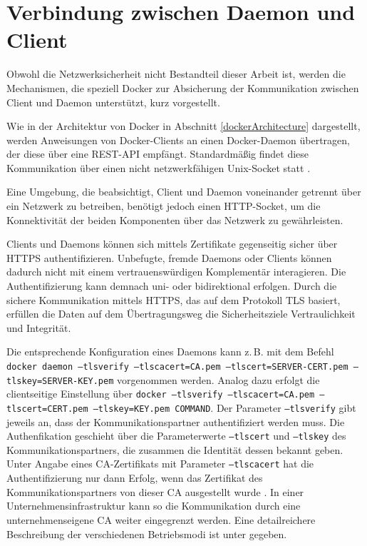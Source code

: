 \documentclass[../main.tex]{subfiles}
\begin{document}


  \section{Verbindung zwischen Daemon und Client}
  \label{conClientServer}
    Obwohl die Netzwerksicherheit nicht Bestandteil dieser Arbeit ist, werden die Mechanismen, die speziell Docker zur Absicherung der Kommunikation zwischen Client und Daemon unterstützt, kurz vorgestellt.

    Wie in der Architektur von Docker in Abschnitt \ref{dockerArchitecture} dargestellt, werden Anweisungen von Docker-Clients an einen Docker-Daemon übertragen, der diese über eine \acrshort{REST}-\acrshort{API} empfängt. Standardmäßig findet diese Kommunikation über einen nicht netzwerkfähigen Unix-Socket statt \cite{dockerSecurity}.

    Eine Umgebung, die beabsichtigt, Client und Daemon voneinander getrennt über ein Netzwerk zu betreiben, benötigt jedoch einen HTTP-Socket, um die Konnektivität der beiden Komponenten über das Netzwerk zu gewährleisten.

    Clients und Daemons können sich mittels Zertifikate gegenseitig sicher über HTTPS authentifizieren. Unbefugte, fremde Daemons oder Clients können dadurch nicht mit einem vertrauenswürdigen Komplementär interagieren. Die Authentifizierung kann demnach uni- oder bidirektional erfolgen. Durch die sichere Kommunikation mittels HTTPS, das auf dem Protokoll \acrshort{TLS} basiert, erfüllen die Daten auf dem Übertragungsweg die Sicherheitsziele Vertraulichkeit und Integrität.

    Die entsprechende Konfiguration eines Daemons kann z.\,B. mit dem Befehl \texttt{docker daemon --tlsverify --tlscacert=CA.pem --tlscert=SERVER-CERT.pem --tlskey=SERVER-KEY.pem} vorgenommen werden. Analog dazu erfolgt die clientseitige Einstellung über \texttt{docker --tlsverify --tlscacert=CA.pem --tlscert=CERT.pem --tlskey=KEY.pem COMMAND}. Der Parameter \texttt{--tlsverify} gibt jeweils an, dass der Kommunikationspartner authentifiziert werden muss. Die Authenfikation geschieht über die Parameterwerte \texttt{--tlscert} und \texttt{--tlskey} des Kommunikationspartners, die zusammen die Identität dessen bekannt geben. Unter Angabe eines \acrshort{CA}-Zertifikats mit Parameter \texttt{--tlscacert} hat die Authentifizierung nur dann Erfolg, wenn das Zertifikat des Kommunikationspartners von dieser \acrshort{CA} ausgestellt wurde \cite{dockerSecurityHTTPS}. In einer Unternehmensinfrastruktur kann so die Kommunikation durch eine unternehmenseigene CA weiter eingegrenzt werden. Eine detailreichere Beschreibung der verschiedenen Betriebsmodi ist unter \cite{dockerSecurityHTTPS} gegeben.
\end{document}

